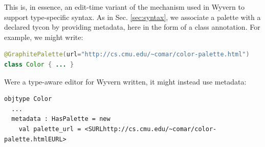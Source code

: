 \begin{contribution}
This is, in essence, an edit-time variant of the mechanism used in Wyvern to support type-specific syntax. As in Sec. \ref{sec:syntax}, we associate a palette with a declared tycon by providing metadata, here in the form of a class annotation. For example, we might write:
\begin{lstlisting}[language=Java]
@GraphitePalette(url="http://cs.cmu.edu/~comar/color-palette.html")
class Color { ... }
\end{lstlisting}
Were a type-aware editor for Wyvern written, it might instead use metadata:
\begin{lstlisting}
objtype Color
  ...
  metadata : HasPalette = new
    val palette_url = <SURLhttp://cs.cmu.edu/~comar/color-palette.htmlEURL>
\end{lstlisting}
\end{contribution}

